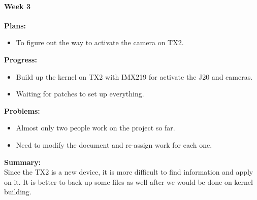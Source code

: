 \paragraph{Week 3}
\begin{adjustwidth}{2.5em}{0pt}
    \vspace{-0.5cm}\textbf{Plans:}
    \vspace{-0.5cm}
    \begin{itemize}
        \item To figure out the way to activate the camera on TX2.
    \end{itemize} 
    \vspace{-0.3cm}\textbf{Progress:}
    \vspace{-0.5cm}
    \begin{itemize}
        \item Build up the kernel on TX2 with IMX219 for activate the J20 and cameras.
        \item Waiting for patches to set up everything.
    \end{itemize} 
    \vspace{-0.3cm}\textbf{Problems:}
    \vspace{-0.5cm}
    \begin{itemize}
        \item Almost only two people work on the project so far.
        \item Need to modify the document and re-assign work for each one.
    \end{itemize}  
    \vspace{-0.3cm}\noindent\textbf{Summary:}\\
    \noindent Since the TX2 is a new device, it is more difficult to find information and apply on 
    it. It is better to back up some files as well after we would be done on kernel building. \\
\end{adjustwidth} 

